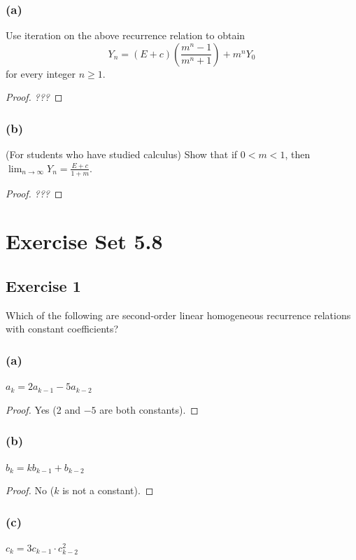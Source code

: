 \documentclass[14pt]{extarticle}
\newcommand{\dps}{\displaystyle}
\begin{document}
\subsubsection{(a)}
Use iteration on the above recurrence relation to obtain
\[
Y_n = (E + c)\left(\frac{m^n - 1}{m^n + 1}\right) + m^n Y_0
\]
for every integer \(n \geq 1\).

\begin{proof}
{\it ???}
\end{proof}

\subsubsection{(b)}
(For students who have studied calculus) Show that if \(0 < m < 1\), then \(\dps \lim_{n \to \infty} Y_n = \frac{E + c}{1 + m}\).

\begin{proof}
{\it ???}
\end{proof}

\section{Exercise Set 5.8}

\subsection{Exercise 1}
Which of the following are second-order linear homogeneous recurrence relations with constant coefficients?

\subsubsection{(a)}
\(a_k = 2a_{k-1} - 5a_{k-2}\)

\begin{proof}
Yes (2 and $-5$ are both constants).
\end{proof}

\subsubsection{(b)}
\(b_k = kb_{k-1} + b_{k-2}\)

\begin{proof}
No ($k$ is not a constant).
\end{proof}

\subsubsection{(c)}
\(c_k = 3c_{k-1} \cdot c^2_{k - 2}\)
\end{document}
